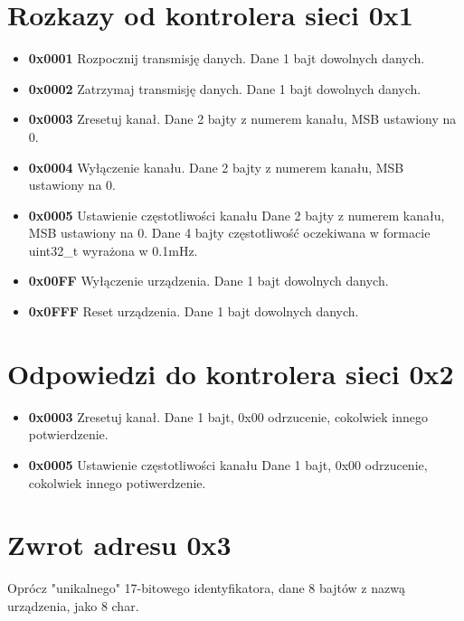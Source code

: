 \documentclass{article}
\begin{document}
\section*{Rozkazy od kontrolera sieci 0x1}
\begin{itemize}
    \item \textbf{0x0001} Rozpocznij transmisję danych. 
    Dane 1 bajt dowolnych danych.
    \item \textbf{0x0002} Zatrzymaj transmisję danych. 
    Dane 1 bajt dowolnych danych.
    \item \textbf{0x0003} Zresetuj kanał. 
    Dane 2 bajty z numerem kanału, MSB ustawiony na 0.
    \item \textbf{0x0004} Wyłączenie kanału.
    Dane 2 bajty z numerem kanału, MSB ustawiony na 0.

    \item \textbf{0x0005}
    Ustawienie częstotliwości kanału
    Dane 2 bajty z numerem kanału, MSB ustawiony na 0.
    Dane 4 bajty częstotliwość oczekiwana w formacie uint32\_t wyrażona w 0.1mHz.
    \item \textbf{0x00FF} Wyłączenie urządzenia. 
    Dane 1 bajt dowolnych danych.
    \item \textbf{0x0FFF} Reset urządzenia. 
    Dane 1 bajt dowolnych danych.
\end{itemize}

\section*{Odpowiedzi do kontrolera sieci 0x2}
\begin{itemize}
    \item \textbf{0x0003} Zresetuj kanał.
    Dane 1 bajt, 0x00 odrzucenie, cokolwiek innego potwierdzenie.
    \item \textbf{0x0005} Ustawienie częstotliwości kanału
    Dane 1 bajt, 0x00 odrzucenie, cokolwiek innego potiwerdzenie.
\end{itemize}

\section*{Zwrot adresu 0x3}
Oprócz "unikalnego" 17-bitowego identyfikatora, dane 8 bajtów z nazwą urządzenia, jako 8 char.
\end{document}

